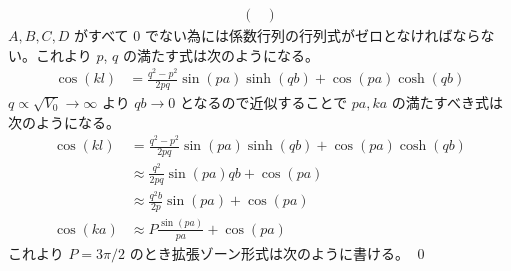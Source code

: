 \documentclass[uplatex,dvipdfmx,a4paper,11pt]{jlreq}
\makeatletter
\numberwithin{equation}{section}
\theoremstyle{definition}
\renewenvironment{proof}[1][\proofname]{\par
  \normalfont
  \topsep6\p@\@plus6\p@ \trivlist
  \item[\hskip\labelsep{\bfseries #1}\@addpunct{\bfseries}]\ignorespaces\quad\par
}{%
  \qed\endtrivlist\@endpefalse
}
\renewcommand\proofname{証明}
\makeatother
\begin{document}
\begin{proof}
\begin{align}
\begin{pmatrix}
    \end{pmatrix}
  \end{align}
  $A, B, C, D$ がすべて 0 でない為には係数行列の行列式がゼロとなければならない。これより $p$, $q$ の満たす式は次のようになる。
  \begin{align}
    \cos(kl) & = \frac{q^2 - p^2}{2pq}\sin(pa)\sinh(qb) + \cos(pa)\cosh(qb)
  \end{align}
  $q \propto \sqrt{V_0} \to \infty$ より $qb\to 0$ となるので近似することで $pa, ka$ の満たすべき式は次のようになる。
  \begin{align}
    \cos(kl) & = \frac{q^2 - p^2}{2pq}\sin(pa)\sinh(qb) + \cos(pa)\cosh(qb) \\
             & \approx \frac{q^2}{2pq}\sin(pa)qb + \cos(pa)                 \\
             & \approx \frac{q^2b}{2p}\sin(pa) + \cos(pa)                   \\
    \cos(ka) & \approx P\frac{\sin(pa)}{pa} + \cos(pa)
  \end{align}
  これより $P = 3\pi/2$ のとき拡張ゾーン形式は次のように書ける。
\end{proof}

\clearpage

\setcounter{subsection}{8}
\end{document}
